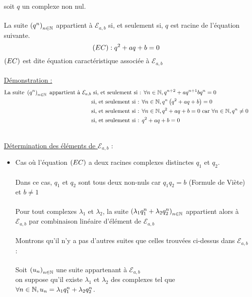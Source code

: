 \begin{dem}
\begin{enumerate}
            soit \(q\) un complexe non nul. \\~\\
            La suite \(\left(q^n\right)_{n\in \mathbb{N}} \) appartient à \(\mathcal{E}_{a,b}\) si, et seulement si, \(q\) est racine de l'équation suivante.
            \[\left(EC\right) : q^2 + aq+b=0\]
            \(\left(EC\right)\) est dite équation caractéristique associée à \(\mathcal{E}_{a,b}\)\\~\\
            \underline{Démonstration :}
            \begin{align*}
            \text{La suite }\left(q^n\right)_{n \in \mathbb{N}}\text{ appartient à }\mathcal{E}_{a,b} &\text{ si, et seulement si : } \forall n \in \mathbb{N}, q^{n+2} + a q^{n+1} b q^n =0 \\
            &\text{si, et seulement si : } \forall n \in \mathbb{N},q^n\left(q^2 + aq +b\right) =0 \\
            &\text{si, et seulement si : } \forall n \in \mathbb{N}, q^2 +aq+b =0 \text{ car } \forall n \in \mathbb{N},q^n \neq 0\\
            &\text{si, et seulement si : } q^2 + aq +b =0
            \end{align*}
    \end{enumerate}
    ~\\
    \underline{Détermination des éléments de \(\mathcal{E}_{a,b}\)} : \\
    \begin{itemize}
        \item Cas où l'équation \(\left(EC\right)\) a deux racines complexes distinctes \(q_1\) et \(q_2\).\\~\\
        Dans ce cas, \(q_1\) et \(q_2\) sont tous deux non-nuls car \(q_1 q_2 = b\) (Formule de Viète) et \(b\neq 1\)\\~\\
        Pour tout complexes \(\lambda_1\) et \(\lambda_2\), la suite \(\left(\lambda_1 q_1^n + \lambda_2q_2^n\right)_{n \in \mathbb{N}}\) appartient alors à \(\mathcal{E}_{a,b}\) par combinaison linéaire d'élément de \(\mathcal{E}_{a,b}\) \\~\\
        Montrons qu'il n'y a pas d'autres suites que celles trouvées ci-dessus dans \(\mathcal{E}_{a,b}\) : \\~\\
        Soit \(\left(u_n\right)_{n \in \mathbb{N}}\) une suite appartenant à \(\mathcal{E}_{a,b}\)\\
        \analyse 
        on suppose qu'il existe \(\lambda_1\) et \(\lambda_2\) des complexes tel que \(\forall n \in \mathbb{N}, u_n = \lambda_1 q_1^n + \lambda_2 q_2^n\). \\

\end{itemize}
\end{dem}
